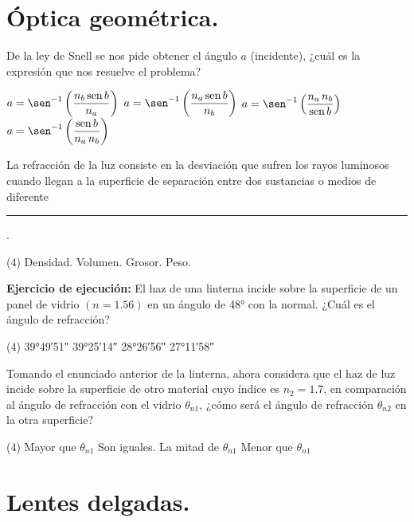 \documentclass[12pt, letter]{exam}
\begin{document}
\begin{questions}
    \section{Óptica geométrica.}

    \question De la ley de Snell se nos pide obtener el ángulo $a$ (incidente), ¿cuál es la expresión que nos resuelve el problema?
    \begin{tasks}
        \task $ a = \sen^{-1} \left(\dfrac{n_{b} \, \text{sen} \, b}{n_{a}} \right)$
        \task $ a = \sen^{-1} \left(\dfrac{n_{a} \, \text{sen} \, b}{n_{b}} \right)$
        \task $ a = \sen^{-1} \left(\dfrac{n_{a} \, n_{b}}{\text{sen} \, b} \right)$
        \task $ a = \sen^{-1} \left(\dfrac{\text{sen} \, b}{n_{a} \, n_{b}} \right)$
    \end{tasks}
    \question La refracción de la luz consiste en la desviación que sufren los rayos luminosos cuando llegan a la superficie de separación entre dos sustancias o medios de diferente \rule{2.5cm}{0.1mm}.
    \begin{tasks}(4)
        \task Densidad.
        \task Volumen.
        \task Grosor.
        \task Peso.
    \end{tasks}
    \question \label{Problema_01} \textbf{Ejercicio de ejecución: } El haz de una linterna incide sobre la superficie de un panel de vidrio $(n = 1.56)$ en un ángulo de \ang{48} con la normal. ¿Cuál es el ángulo de refracción?
    \begin{tasks}(4)
        \task \ang{39;49;51}
        \task \ang{39;25;14}
        \task \ang{28;26;56}
        \task \ang{27;11;58}
    \end{tasks}
    \question Tomando el enunciado anterior de la linterna, ahora considera que el haz de luz incide sobre la superficie de otro material cuyo índice es $n_{2} = 1.7$, en comparación al ángulo de refracción con el vidrio $\theta_{n1}$, ¿cómo será el ángulo de refracción $\theta_{n2}$ en la otra superficie?
    \begin{tasks}(4)
        \task Mayor que $\theta_{n1}$
        \task Son iguales.
        \task La mitad de $\theta_{n1}$
        \task Menor que $\theta_{n1}$
    \end{tasks}
    

    \section{Lentes delgadas.}


\end{questions}
\end{document}
